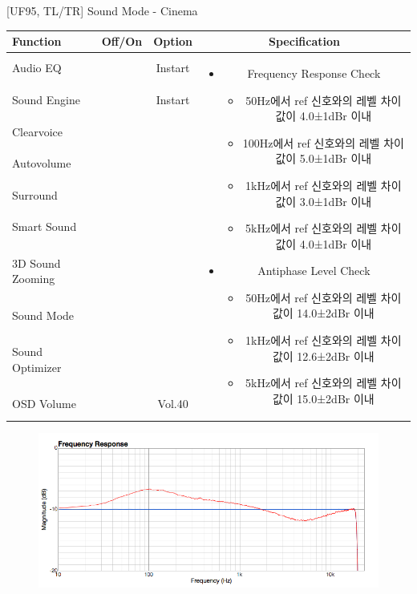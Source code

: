 \begin{frame}[t]{[UF95, TL/TR] Sound Mode - Cinema}
\begin{tiny}
\begin{tabular}{@{}lccc@{}}
\toprule
Function & Off/On & Option & Specification \\
\midrule
Audio EQ & \color{black}{Off} & Instart &
\multirow{10}{60mm}{
\begin{itemize}
\item Frequency Response Check
	\begin{itemize}
  \item 50Hz에서 ref 신호와의 레벨 차이값이 4.0±1dBr 이내
  \item 100Hz에서 ref 신호와의 레벨 차이값이 5.0±1dBr 이내
  \item 1kHz에서 ref 신호와의 레벨 차이값이 3.0±1dBr 이내
  \item 5kHz에서 ref 신호와의 레벨 차이값이 4.0±1dBr 이내
	\end{itemize}
\item Antiphase Level Check
	\begin{itemize}
	\item 50Hz에서 ref 신호와의 레벨 차이값이 14.0±2dBr 이내
	\item 1kHz에서 ref 신호와의 레벨 차이값이 12.6±2dBr 이내
	\item 5kHz에서 ref 신호와의 레벨 차이값이 15.0±2dBr 이내
	\end{itemize}
\end{itemize}
} \\
Sound Engine & \color{blue}{On} & Instart & \\
Clearvoice & \color{black}{Off} & & \\
Autovolume & \color{black}{Off} & & \\
Surround & \color{black}{Off} & & \\
Smart Sound & \color{black}{Off} & & \\
3D Sound Zooming & \color{black}{Off} & & \\
Sound Mode & \color{blue}{On} & \color{blue}{Cinema} & \\
Sound Optimizer & \color{black}{Off} & & \\
OSD Volume & \color{blue}{On} & Vol.40 & \\
\midrule
\end{tabular}
\end{tiny}

\begin{figure}[b]
\includegraphics[height=0.4\textwidth]{figures/cinema_34.png}
\end{figure}

\end{frame}

